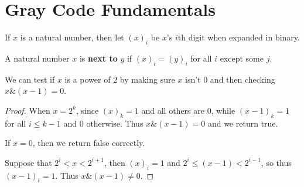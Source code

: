 %

\chapter{Gray Code Fundamentals}

\begin{definition}
    If $x$ is a natural number, then let $(x)_i$ be $x$'s $i$th digit when expanded in binary.
    \label{def:test_digit}
    \leanok
\end{definition}

\begin{definition}
    \label{def:next_to}
    \leanok
    A natural number $x$ is \textbf{next to} $y$ if $(x)_i = (y)_i$ for all $i$ except some $j$.
\end{definition}

\begin{theorem}
    \label{thm:bitwise_test_power_of_two}
    \leanok
    We can test if $x$ is a power of $2$ by making sure $x$ isn't 0 and then checking $x \& (x - 1) = 0$.
\end{theorem}

\begin{proof}
    \leanok

    When $x = 2^k$, since $(x)_k = 1$ and all others are $0$, while $(x - 1)_k = 1$ for all $i \le k-1$ and $0$ otherwise. Thus $x \& (x - 1) = 0$ and we return true.

    If $x = 0$, then we return false correctly.
    
    Suppose that $2^i < x < 2^{i+1}$, then $(x)_i = 1$ and $2^i \le (x - 1) < 2^{i-1}$,
    so thus $(x-1)_i = 1$. Thus $x \& (x - 1) \neq 0$.
\end{proof}

